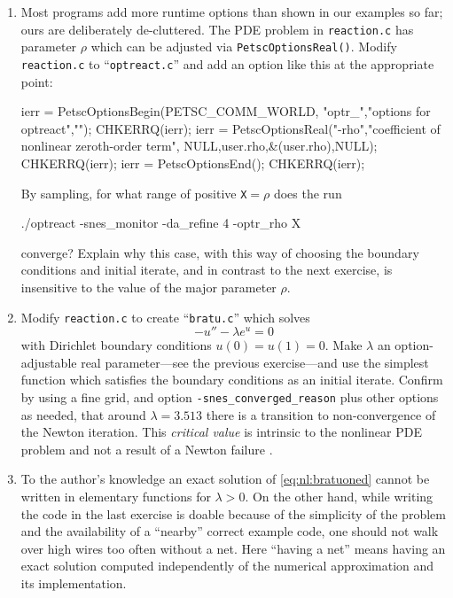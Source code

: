 \begin{enumerate}
\item Most \PETSc programs add more runtime options than shown in our examples so far; ours are deliberately de-cluttered.  The PDE problem in \texttt{reaction.c} has parameter $\rho$ which can be adjusted via \texttt{PetscOptionsReal()}.  Modify \texttt{reaction.c} to ``\texttt{optreact.c}'' and add an option like this at the appropriate point:
\begin{code}
  ierr = PetscOptionsBegin(PETSC_COMM_WORLD,
                           "optr_","options for optreact",""); CHKERRQ(ierr);
  ierr = PetscOptionsReal("-rho","coefficient of nonlinear zeroth-order term",
                          NULL,user.rho,&(user.rho),NULL); CHKERRQ(ierr);
  ierr = PetscOptionsEnd(); CHKERRQ(ierr);
\end{code}
By sampling, for what range of positive \texttt{X}$=\rho$ does the run
\begin{cline}
./optreact -snes_monitor -da_refine 4 -optr_rho X
\end{cline}
converge?  Explain why this case, with this way of choosing the boundary conditions and initial iterate, and in contrast to the next exercise, is insensitive to the value of the major parameter $\rho$.

\item Modify \texttt{reaction.c} to create ``\texttt{bratu.c}'' which solves
\begin{equation}
    - u'' - \lambda e^u = 0 \label{eq:nl:bratuoned}
\end{equation}
with Dirichlet boundary conditions $u(0)=u(1)=0$.  Make $\lambda$ an option-adjustable real parameter---see the previous exercise---and use the simplest function which satisfies the boundary conditions as an initial iterate.  Confirm by using a fine grid, and option \texttt{-snes\_converged\_reason} plus other options as needed, that around $\lambda=3.513$ there is a transition to non-convergence of the Newton iteration.  This \emph{critical value} is intrinsic to the nonlinear PDE problem and not a result of a Newton failure \citep{Doedeletal1991}.

\item To the author's knowledge an exact solution of \eqref{eq:nl:bratuoned} cannot be written in elementary functions for $\lambda>0$.  On the other hand, while writing the code in the last exercise is doable because of the simplicity of the problem and the availability of a ``nearby'' correct example code, one should not walk over high wires too often without a net.  Here ``having a net'' means having an exact solution computed independently of the numerical approximation and its implementation.


\end{enumerate}
